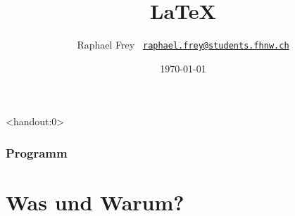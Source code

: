 \documentclass{beamer}                %
\title{\vspace*{4em}\Huge\LaTeX}
\date{\today}
\author{%
    Raphael Frey%
    \hfill%
    \footnotesize\texttt{%
        \href{mailto:raphael.frey@students.fhnw.ch}%
        {raphael.frey@students.fhnw.ch}}}
\institute{\vspace*{7em}\hfill\texttt{[image: images/fhnw.eps]}}
\begin{document}
                                                              

\maketitle %


\begin{frame}<handout:0> %
    \frametitle{Programm}
    \tableofcontents
\end{frame}


\section<handout:0>{Was und Warum?} %
\end{document}
